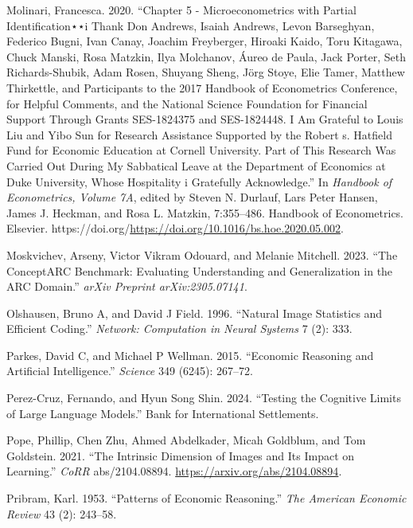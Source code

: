 \documentclass[
]{article}
\newlength{\cslhangindent}
\newenvironment{CSLReferences}[2] %
 {\begin{list}{}{%
  \setlength{\itemindent}{0pt}
  \setlength{\leftmargin}{0pt}
  \setlength{\parsep}{0pt}
  \ifodd #1
   \setlength{\leftmargin}{\cslhangindent}
   \setlength{\itemindent}{-1\cslhangindent}
  \fi
  \setlength{\itemsep}{#2\baselineskip}}}
 {\end{list}}
\begin{document}
\begin{CSLReferences}{1}{0}
Molinari, Francesca. 2020. {``Chapter 5 - Microeconometrics with Partial
Identification⋆⋆i Thank Don Andrews, Isaiah Andrews, Levon Barseghyan,
Federico Bugni, Ivan Canay, Joachim Freyberger, Hiroaki Kaido, Toru
Kitagawa, Chuck Manski, Rosa Matzkin, Ilya Molchanov, Áureo de Paula,
Jack Porter, Seth Richards-Shubik, Adam Rosen, Shuyang Sheng, Jörg
Stoye, Elie Tamer, Matthew Thirkettle, and Participants to the 2017
Handbook of Econometrics Conference, for Helpful Comments, and the
National Science Foundation for Financial Support Through Grants
SES-1824375 and SES-1824448. I Am Grateful to Louis Liu and Yibo Sun for
Research Assistance Supported by the Robert s. Hatfield Fund for
Economic Education at Cornell University. Part of This Research Was
Carried Out During My Sabbatical Leave at the Department of Economics at
Duke University, Whose Hospitality i Gratefully Acknowledge.''} In
\emph{Handbook of Econometrics, Volume 7A}, edited by Steven N. Durlauf,
Lars Peter Hansen, James J. Heckman, and Rosa L. Matzkin, 7:355--486.
Handbook of Econometrics. Elsevier.
https://doi.org/\url{https://doi.org/10.1016/bs.hoe.2020.05.002}.

Moskvichev, Arseny, Victor Vikram Odouard, and Melanie Mitchell. 2023.
{``The ConceptARC Benchmark: Evaluating Understanding and Generalization
in the ARC Domain.''} \emph{arXiv Preprint arXiv:2305.07141}.

Olshausen, Bruno A, and David J Field. 1996. {``Natural Image Statistics
and Efficient Coding.''} \emph{Network: Computation in Neural Systems} 7
(2): 333.

Parkes, David C, and Michael P Wellman. 2015. {``Economic Reasoning and
Artificial Intelligence.''} \emph{Science} 349 (6245): 267--72.

Perez-Cruz, Fernando, and Hyun Song Shin. 2024. {``Testing the Cognitive
Limits of Large Language Models.''} Bank for International Settlements.

Pope, Phillip, Chen Zhu, Ahmed Abdelkader, Micah Goldblum, and Tom
Goldstein. 2021. {``The Intrinsic Dimension of Images and Its Impact on
Learning.''} \emph{CoRR} abs/2104.08894.
\url{https://arxiv.org/abs/2104.08894}.

Pribram, Karl. 1953. {``Patterns of Economic Reasoning.''} \emph{The
American Economic Review} 43 (2): 243--58.


\end{CSLReferences}
\end{document}
